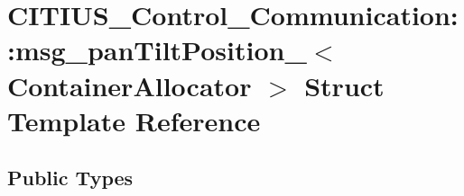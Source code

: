 \hypertarget{struct_c_i_t_i_u_s___control___communication_1_1msg__pan_tilt_position__}{\section{\-C\-I\-T\-I\-U\-S\-\_\-\-Control\-\_\-\-Communication\-:\-:msg\-\_\-pan\-Tilt\-Position\-\_\-$<$ \-Container\-Allocator $>$ \-Struct \-Template \-Reference}
\label{struct_c_i_t_i_u_s___control___communication_1_1msg__pan_tilt_position__}
}
\subsection*{\-Public \-Types}

